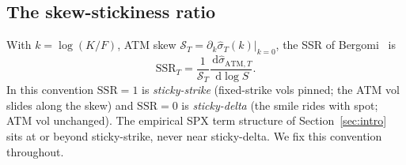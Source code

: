 \documentclass[11pt]{article}
\newcommand{\SSR}{\mathrm{SSR}}
\newcommand{\dd}{\,\mathrm{d}}
\begin{document}
\subsection{The skew-stickiness ratio}
With $k=\log(K/F)$, ATM skew $\mathcal S_T=\partial_k\widehat\sigma_T(k)|_{k=0}$, the
SSR of Bergomi~\cite{bergomi2009} is
\begin{equation}
\SSR_T=\frac{1}{\mathcal S_T}\frac{\dd \widehat\sigma_{\mathrm{ATM},T}}{\dd\log S}.
\label{eq:ssr-def}
\end{equation}
In this convention $\SSR=1$ is \emph{sticky-strike} (fixed-strike vols pinned; the ATM
vol slides along the skew) and $\SSR=0$ is \emph{sticky-delta} (the smile rides with
spot; ATM vol unchanged). The empirical SPX term structure of Section~\ref{sec:intro} sits at
or beyond sticky-strike, never near sticky-delta. We fix this convention throughout.
\end{document}
